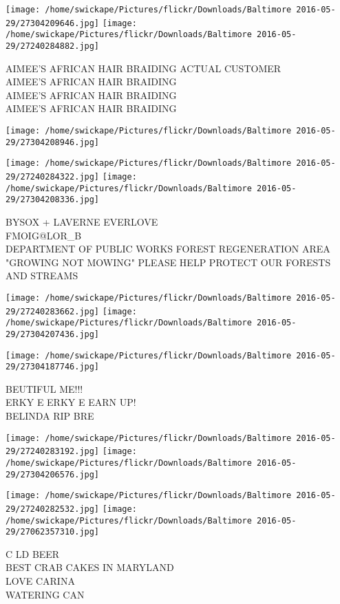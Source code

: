 \documentclass[10pt,letterpaper]{article}
\begin{document}
\texttt{[image: /home/swickape/Pictures/flickr/Downloads/Baltimore 2016-05-29/27304209646.jpg]}
\texttt{[image: /home/swickape/Pictures/flickr/Downloads/Baltimore 2016-05-29/27240284882.jpg]}

AIMEE'S AFRICAN HAIR BRAIDING ACTUAL CUSTOMER\\
AIMEE'S AFRICAN HAIR BRAIDING\\
AIMEE'S AFRICAN HAIR BRAIDING\\
AIMEE'S AFRICAN HAIR BRAIDING
\pagebreak

\texttt{[image: /home/swickape/Pictures/flickr/Downloads/Baltimore 2016-05-29/27304208946.jpg]}

\vspace{0.25in}
\texttt{[image: /home/swickape/Pictures/flickr/Downloads/Baltimore 2016-05-29/27240284322.jpg]}
\texttt{[image: /home/swickape/Pictures/flickr/Downloads/Baltimore 2016-05-29/27304208336.jpg]}

BYSOX + LAVERNE EVERLOVE\\
FMOIG@LOR\_B\\
DEPARTMENT OF PUBLIC WORKS FOREST REGENERATION AREA "GROWING NOT MOWING" PLEASE HELP PROTECT OUR FORESTS AND STREAMS
\pagebreak

\texttt{[image: /home/swickape/Pictures/flickr/Downloads/Baltimore 2016-05-29/27240283662.jpg]}
\texttt{[image: /home/swickape/Pictures/flickr/Downloads/Baltimore 2016-05-29/27304207436.jpg]}

\vspace{0.25in}
\texttt{[image: /home/swickape/Pictures/flickr/Downloads/Baltimore 2016-05-29/27304187746.jpg]}

BEUTIFUL ME!!!\\
ERKY E ERKY E EARN UP!\\
BELINDA RIP BRE
\pagebreak

\texttt{[image: /home/swickape/Pictures/flickr/Downloads/Baltimore 2016-05-29/27240283192.jpg]}
\texttt{[image: /home/swickape/Pictures/flickr/Downloads/Baltimore 2016-05-29/27304206576.jpg]}

\texttt{[image: /home/swickape/Pictures/flickr/Downloads/Baltimore 2016-05-29/27240282532.jpg]}
\texttt{[image: /home/swickape/Pictures/flickr/Downloads/Baltimore 2016-05-29/27062357310.jpg]}

C LD BEER\\
BEST CRAB CAKES IN MARYLAND\\
LOVE CARINA\\
WATERING CAN
\pagebreak
\end{document}
